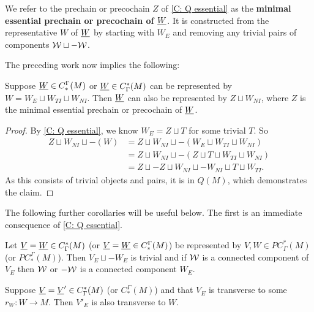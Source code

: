 \begin{definition}\label{D: minimal essential}
We refer to the prechain or precochain $Z$ of \cref{C: Q essential} as the \textbf{minimal essential prechain or precochain of $\underline{W}$}.
It is constructed from the representative $W$ of $\underline{W}$ by starting with $W_E$ and removing any trivial pairs of components $\mathcal{W} \sqcup - \mathcal{W}$.
\end{definition}


The preceding work now implies the following:

\begin{theorem}\label{T: minimal rep}
	Suppose $\underline{W} \in C_*^\Gamma(M)$ or $\underline{W} \in C^*_\Gamma(M)$ can be represented by $W = W_E \sqcup W_{TI} \sqcup W_{NI}$.
	Then $\underline{W}$ can also be represented by $Z \sqcup W_{NI}$, where $Z$ is the minimal essential prechain or precochain of $\underline{W}$.
\end{theorem}
\begin{proof}
	By \cref{C: Q essential}, we know $W_E = Z \sqcup T$ for some trivial $T$.
	So
	\begin{align*}
		Z \sqcup W_{NI} \sqcup -(W) &= 	Z \sqcup W_{NI} \sqcup - (W_E \sqcup W_{TI} \sqcup W_{NI})\\
		&= Z \sqcup W_{NI} \sqcup - (Z \sqcup T \sqcup W_{TI} \sqcup W_{NI})\\
		&= Z \sqcup -Z \sqcup W_{NI} \sqcup - W_{NI} \sqcup T \sqcup W_{TI}.
	\end{align*}
	As this consists of trivial objects and pairs, it is in $Q(M)$, which demonstrates the claim.
\end{proof}

The following further corollaries will be useful below.
The first is an immediate consequence of \cref{C: Q essential}.

\begin{corollary}\label{L: essential}
	Let $\underline{V} = \underline{W} \in C^*_\Gamma(M)$ (or $\underline{V} = \underline{W} \in C_*^\Gamma(M)$) be represented by $V,W \in PC^*_\Gamma(M)$ (or $PC^\Gamma_*(M)$).
	Then $V_E \sqcup -W_E$ is trivial and if $\mathcal{W}$ is a connected component of $V_E$ then $\mathcal{W}$ or $-\mathcal{W}$ is a connected component $W_E$.
\end{corollary}

\begin{corollary}\label{C: essential trans}
	Suppose $\underline{V} = \underline{V}' \in C^*_\Gamma(M)$ (or $C_*^\Gamma(M)$) and that $V_E$ is transverse to some $r_W \colon W \to M$.
	Then $V'_E$ is also transverse to $W$.
\end{corollary}

